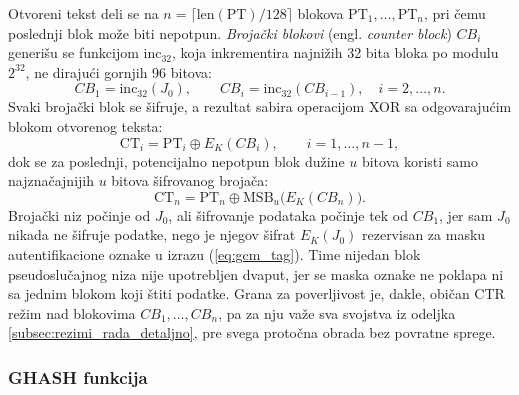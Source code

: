 Otvoreni tekst deli se na $n = \lceil \mathrm{len}(\mathrm{PT})/128 \rceil$ blokova $\mathrm{PT}_1, \ldots, \mathrm{PT}_n$, pri čemu poslednji blok može biti nepotpun. \textit{Brojački blokovi} (engl. \textit{counter block}) $CB_i$ generišu se funkcijom $\mathrm{inc_{32}}$, koja inkrementira najnižih 32 bita bloka po modulu $2^{32}$, ne dirajući gornjih 96 bitova:
\begin{equation}
    CB_1 = \mathrm{inc_{32}}(J_0), \qquad CB_i = \mathrm{inc_{32}}(CB_{i-1}), \quad i = 2, \ldots, n.
\end{equation}
Svaki brojački blok se šifruje, a rezultat sabira operacijom XOR sa odgovarajućim blokom otvorenog teksta:
\begin{equation}
    \mathrm{CT}_i = \mathrm{PT}_i \oplus E_K(CB_i), \qquad i = 1, \ldots, n-1,
\end{equation}
dok se za poslednji, potencijalno nepotpun blok dužine $u$ bitova koristi samo najznačajnijih $u$ bitova šifrovanog brojača:
\begin{equation}
    \mathrm{CT}_n = \mathrm{PT}_n \oplus \mathrm{MSB}_u\big(E_K(CB_n)\big).
\end{equation}
Brojački niz počinje od $J_0$, ali šifrovanje podataka počinje tek od $CB_1$, jer sam $J_0$ nikada ne šifruje podatke, nego je njegov šifrat $E_K(J_0)$ rezervisan za masku autentifikacione oznake u izrazu (\ref{eq:gcm_tag}). Time nijedan blok pseudoslučajnog niza nije upotrebljen dvaput, jer se maska oznake ne poklapa ni sa jednim blokom koji štiti podatke. Grana za poverljivost je, dakle, običan CTR režim nad blokovima $CB_1, \ldots, CB_n$, pa za nju važe sva svojstva iz odeljka \ref{subsec:rezimi_rada_detaljno}, pre svega protočna obrada bez povratne sprege.

\subsubsection{GHASH funkcija}
\label{subsubsec:ghash}

